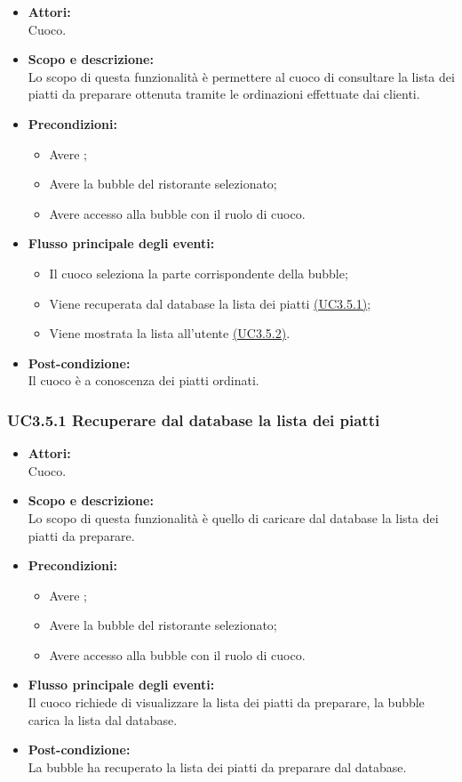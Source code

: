 \begin{itemize}
	\item \textbf{Attori:}
	\\Cuoco.
	\item \textbf{Scopo e descrizione:} 
	\\Lo scopo di questa funzionalità è permettere al cuoco di consultare la lista dei piatti da preparare ottenuta tramite le ordinazioni effettuate dai clienti.
	\item \textbf{Precondizioni:}
	\begin{itemize}
		\item Avere ;
		\item Avere la bubble del ristorante selezionato;
		\item Avere accesso alla bubble con il ruolo di cuoco.
	\end{itemize}
	\item \textbf{Flusso principale degli eventi:}
	\begin{itemize}
		\item Il cuoco seleziona la parte corrispondente della bubble;
		\item Viene recuperata dal database la lista dei piatti \hyperref[UC3.5.1]{(UC3.5.1)};
		\item Viene mostrata la lista all’utente \hyperref[UC3.5.2]{(UC3.5.2)}.
	\end{itemize}
	\item \textbf{Post-condizione:}
	\\Il cuoco è a conoscenza dei piatti ordinati.
\end{itemize}

\subsubsection{UC3.5.1 Recuperare dal database la lista dei piatti} \label{UC3.5.1}

\begin{itemize}
	\item \textbf{Attori:}
	\\Cuoco.
	\item \textbf{Scopo e descrizione:} 
	\\Lo scopo di questa funzionalità è quello di caricare dal database la lista dei piatti da preparare.
	\item \textbf{Precondizioni:}
	\begin{itemize}
		\item Avere ;
		\item Avere la bubble del ristorante selezionato;
		\item Avere accesso alla bubble con il ruolo di cuoco.
	\end{itemize}
	\item \textbf{Flusso principale degli eventi:}
	\\Il cuoco richiede di visualizzare la lista dei piatti da preparare, la bubble carica la lista dal database.
	\item \textbf{Post-condizione:}
	\\La bubble ha recuperato la lista dei piatti da preparare dal database.
\end{itemize}

